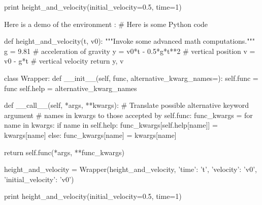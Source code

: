 print height_and_velocity(initial_velocity=0.5, time=1)


\noindent
Here is a demo of the environment :
# Here is some Python code

def height_and_velocity(t, v0):
    """Invoke some advanced math computations."""
    g = 9.81                  # acceleration of gravity
    y = v0*t - 0.5*g*t**2     # vertical position
    v = v0 - g*t              # vertical velocity
    return y, v

class Wrapper:
    def __init__(self, func, alternative_kwarg_names={}):
        self.func = func
        self.help = alternative_kwarg_names

    def __call__(self, *args, **kwargs):
        # Translate possible alternative keyword argument
        # names in kwargs to those accepted by self.func:
        func_kwargs = {}
        for name in kwargs:
            if name in self.help:
                func_kwargs[self.help[name]] = kwargs[name]
            else:
                func_kwargs[name] = kwargs[name]

        return self.func(*args, **func_kwargs)

height_and_velocity = Wrapper(height_and_velocity,
                              {'time': 't',
                               'velocity': 'v0',
                               'initial_velocity': 'v0'})

print height_and_velocity(initial_velocity=0.5, time=1)

